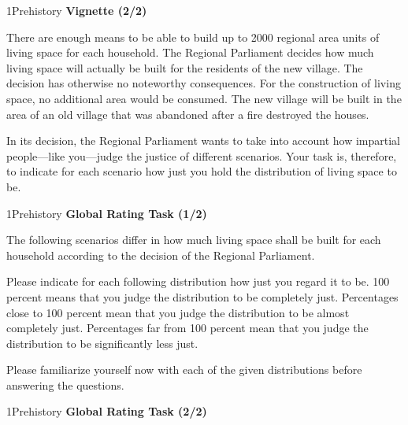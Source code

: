 \documentclass[xcolor=table,9pt,aspectratio=169]{beamer}
\begin{document}
\begin{frame}{\vspace*{10mm}1\hspace*{1em}Prehistory}
   \textbf{Vignette (2/2)}
   
   \medskip
   There are enough means to be able to build up to 2000 regional area units of living space for each household.
   The Regional Parliament decides how much living space will actually be built for the residents of the new village.
   The decision has otherwise no noteworthy consequences.
   For the construction of living space, no additional area would be consumed.
   The new village will be built in the area of an old village that was abandoned after a fire destroyed the houses.
   
   \medskip
   In its decision, the Regional Parliament wants to take into account how impartial people---like you---judge the justice of different scenarios.
   Your task is, therefore, to indicate for each scenario how just you hold the distribution of living space to be.
\end{frame}


\begin{frame}{\vspace*{10mm}1\hspace*{1em}Prehistory}
   \textbf{Global Rating Task (1/2)}
   
   \medskip
   The following scenarios differ in how much living space shall be built for each household according to the decision of the Regional Parliament.
   
   \medskip
   Please indicate for each following distribution how just you regard it to be.
   100 percent means that you judge the distribution to be completely just.
   Percentages close to 100 percent mean that you judge the distribution to be almost completely just.
   Percentages far from 100 percent mean that you judge the distribution to be significantly less just.
   
   \medskip
   Please familiarize yourself now with each of the given distributions before answering the questions.
\end{frame}


\begin{frame}{\vspace*{10mm}1\hspace*{1em}Prehistory}
   \textbf{Global Rating Task (2/2)}
   \begin{center}
   \end{center}
\end{frame}
\end{document}
